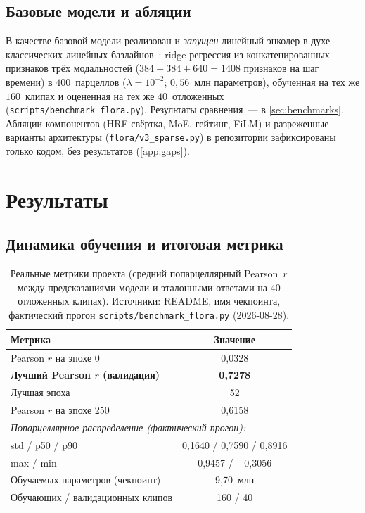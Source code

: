 \documentclass[11pt,a4paper]{article}
\begin{document}
\subsection{Базовые модели и абляции}
\label{sec:baselines}

В качестве базовой модели реализован и \emph{запущен} линейный
энкодер в духе классических линейных базлайнов~\cite{Kay2008}:
ridge-регрессия из конкатенированных признаков трёх модальностей
($384 + 384 + 640 = 1408$ признаков на шаг времени) в $400$~парцеллов
($\lambda = 10^{-2}$; $0{,}56$~млн параметров), обученная на тех же
$160$~клипах и оцененная на тех же $40$~отложенных
(\texttt{scripts/benchmark\_flora.py}). Результаты сравнения~--- в
\cref{sec:benchmarks}. Абляции компонентов (HRF-свёртка, MoE,
гейтинг, FiLM) и разреженные варианты архитектуры
(\texttt{flora/v3\_sparse.py}) в репозитории зафиксированы только
кодом, без результатов (\cref{app:gaps}).

\section{Результаты}
\label{sec:results}

\subsection{Динамика обучения и итоговая метрика}
\label{sec:main-results}

\begin{table}[H]
\centering
\caption{Реальные метрики проекта (средний попарцеллярный Pearson~$r$
между предсказаниями модели и эталонными ответами на $40$ отложенных
клипах). Источники: README, имя чекпоинта, фактический прогон
\texttt{scripts/benchmark\_flora.py} (2026-08-28).}
\label{tab:results}
\small
\begin{tabular}{lc}
\toprule
Метрика & Значение \\
\midrule
Pearson $r$ на эпохе 0            & 0{,}0328 \\
\textbf{Лучший Pearson $r$ (валидация)} & \textbf{0{,}7278} \\
Лучшая эпоха                      & 52 \\
Pearson $r$ на эпохе 250          & 0{,}6158 \\
\midrule
\multicolumn{2}{l}{\emph{Попарцеллярное распределение (фактический прогон):}} \\
std / p50 / p90                   & 0{,}1640 / 0{,}7590 / 0{,}8916 \\
max / min                         & 0{,}9457 / $-$0{,}3056 \\
\midrule
Обучаемых параметров (чекпоинт)   & 9{,}70~млн \\
Обучающих / валидационных клипов  & 160 / 40 \\
\bottomrule
\end{tabular}
\end{table}
\end{document}
